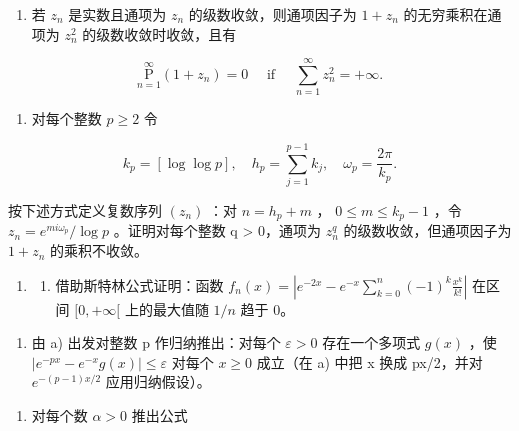 \begin{enumerate}
\def\labelenumi{\alph{enumi})}
\setcounter{enumi}{1}
\tightlist
\item
  若 \(z_{n}\) 是实数且通项为 \(z_{n}\) 的级数收敛，则通项因子为 \(1 + z_{n}\) 的无穷乘积在通项为 \(z_{n}^{2}\) 的级数收敛时收敛，且有
\end{enumerate}

\[
\underset {n = 1} {\overset {\infty} {\mathrm{P}}} (1 + z _ {n}) = 0 \quad \text { if } \quad \sum_ {n = 1} ^ {\infty} z _ {n} ^ {2} = + \infty .
\]

\begin{enumerate}
\def\labelenumi{\alph{enumi})}
\setcounter{enumi}{2}
\tightlist
\item
  对每个整数 \(p \geqslant 2\) 令
\end{enumerate}

\[
k _ {p} = [ \log \log p ], \quad h _ {p} = \sum_ {j = 1} ^ {p - 1} k _ {j}, \quad \omega_ {p} = \frac {2 \pi}{k _ {p}}.
\]

按下述方式定义复数序列 \((z_{n})\) ：对 \(n = h_{p} + m\) ， \(0 \leqslant m \leqslant k_{p} - 1\) ，令 \(z_{n} = e^{mi\omega_{p}} / \log p\) 。证明对每个整数 q \textgreater{} 0，通项为 \(z_{n}^{q}\) 的级数收敛，但通项因子为 \(1 + z_{n}\) 的乘积不收敛。

\begin{enumerate}
\def\labelenumi{\arabic{enumi})}
\setcounter{enumi}{8}
\tightlist
\item
  \begin{enumerate}
  \def\labelenumii{\alph{enumii})}
  \tightlist
  \item
    借助斯特林公式证明：函数 \(f_{n}(x) = \left|e^{-2x} - e^{-x}\sum_{k=0}^{n}(-1)^{k}\frac{x^{k}}{k!}\right|\) 在区间 \([0, +\infty[\) 上的最大值随 \(1/n\) 趋于 0。
  \end{enumerate}
\end{enumerate}

\begin{enumerate}
\def\labelenumi{\alph{enumi})}
\setcounter{enumi}{1}
\tightlist
\item
  由 a) 出发对整数 p 作归纳推出：对每个 \(\varepsilon > 0\) 存在一个多项式 \(g(x)\) ，使 \(\left|e^{-px} - e^{-x}g(x)\right| \leqslant \varepsilon\) 对每个 \(x \geqslant 0\) 成立（在 a) 中把 x 换成 px/2，并对 \(e^{-(p-1)x/2}\) 应用归纳假设）。
\end{enumerate}

\begin{enumerate}
\def\labelenumi{\arabic{enumi})}
\setcounter{enumi}{9}
\tightlist
\item
  对每个数 \(\alpha > 0\) 推出公式
\end{enumerate}

